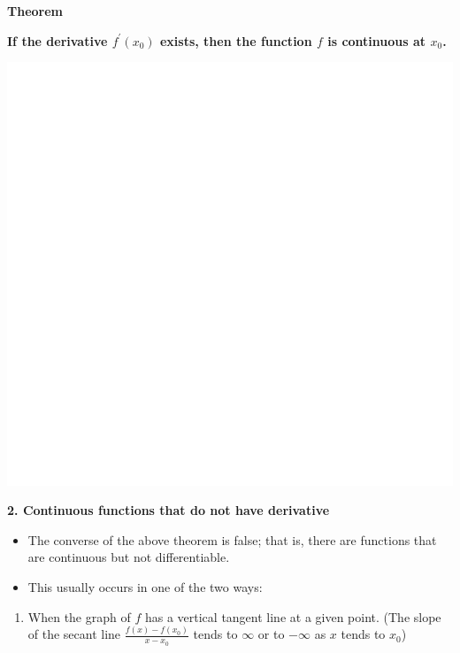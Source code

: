 \documentclass[]{book}
\providecommand{\tightlist}{%
  \setlength{\itemsep}{0pt}\setlength{\parskip}{0pt}}
\begin{document}
\textbf{Theorem}

\textbf{If the derivative \(f^\prime(x_0)\) exists, then the function \(f\) is continuous at \(x_{0}\).}

\begin{center}\includegraphics[width=1\linewidth]{figure/Devbox3-1} \end{center}

\textbf{2. Continuous functions that do not have derivative}

\begin{itemize}
\item
  The converse of the above theorem is false; that is, there are functions that are continuous but not differentiable.
\item
  This usually occurs in one of the two ways:
\end{itemize}

\newpage

\begin{enumerate}
\def\labelenumi{\arabic{enumi}.}
\tightlist
\item
  When the graph of \(f\) has a vertical tangent line at a given point. (The slope of the secant line \(\frac{f(x) - f(x_0)}{x-x_0}\) tends to \(\infty\) or to \(-\infty\) as \(x\) tends to \(x_0\))
\end{enumerate}
\end{document}
